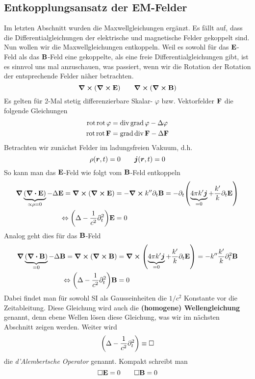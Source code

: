 \subsection{Entkopplungsansatz der EM-Felder}%
\label{sub:entkopplungs-ansatz}
Im letzten Abschnitt wurden die Maxwellgleichungen ergänzt. Es fällt auf, dass die Differentialgleichungen der elektrische und magnetische Felder gekoppelt sind. Nun wollen wir die Maxwellgleichungen entkoppeln. Weil es sowohl für das $\vb E$-Feld als das $\vb B$-Feld eine gekoppelte, als eine freie Differentialgleichungen gibt, ist es sinnvol uns mal anzuschauen, was passiert, wenn wir die Rotation der Rotation der entsprechende Felder näher betrachten.
\begin{equation}
  \curl(\curl \vb E) \qquad \curl(\curl\vb B)
\end{equation}
Es gelten für 2-Mal stetig differenzierbare Skalar- $\varphi$ bzw. Vektorfelder $\vb F$ die folgende Gleichungen
\begin{equation}
  \begin{split}
    \mathrm{rot}\,\mathrm{rot}\,\varphi &= \mathrm{div}\,\mathrm{grad}\,\varphi - \Delta \varphi\\
    \mathrm{rot}\,\mathrm{rot}\,\vb F &= \mathrm{grad}\,\mathrm{div}\, \vb F - \Delta \vb F
  \end{split}
\end{equation}
Betrachten wir zunächst Felder im ladungsfreien Vakuum, d.h.
\begin{equation*}
  \rho(\vb*r, t) = 0 \qquad \vb*j(\vb*r, t) = 0
\end{equation*}
So kann man das $\vb E$-Feld wie folgt vom $\vb B$-Feld entkoppeln
\begin{equation}
  \begin{split}
    \grad\underbrace{(\div \vb E)}_{\propto\rho=0} - \Delta \vb E
    =
    \curl (\curl \vb E) 
    &= -\curl k''\partial_t\vb B 
    =
    -\partial_t\qty(\underbrace{4\pi k'\vb*j}_{=0} + \frac{k'}{k}\partial_t \vb E)\\
    \Leftrightarrow
    \qty(\Delta - \frac{1}{c^2}\partial_t^2) \vb E &=0 
  \end{split}
\end{equation}
Analog geht dies für das $\vb B$-Feld
\begin{equation}
  \begin{split}
    \grad\underbrace{(\div \vb B)}_{=0} - \Delta \vb B
    =
    \curl (\curl \vb B) 
    &= \curl(\underbrace{4\pi k'\vb*j}_{=0} + \frac{k'}{k}\partial_t\vb E)
    = -k''\frac{k'}{k} \partial_t^2\vb B\\
    \Leftrightarrow
    \qty(\Delta - \frac{1}{c^2}\partial_t^2) \vb B &=0 
  \end{split}
\end{equation}
Dabei findet man für sowohl SI als Gausseinheiten die $1/c^2$ Konstante vor
die Zeitableitung. Diese Gleichung wird auch die \textbf{(homogene) Wellengleichung} genannt, denn ebene Wellen lösen diese Gleichung, was wir im nächsten Abschnitt zeigen werden. Weiter wird
\begin{equation}
  \qty(\Delta - \frac{1}{c^2}\partial_t^2)\equiv\Box
\end{equation}
die \textit{d'Alembertsche Operator} genannt. Kompakt schreibt man
\begin{equation}
  \Box \vb E = 0 \qquad \Box \vb B=0
\end{equation}

